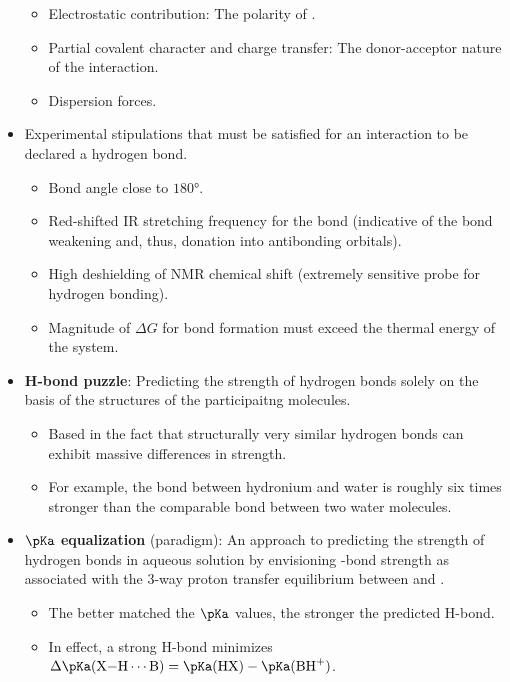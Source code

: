 \documentclass[../notes.tex]{subfiles}
\begin{document}
\begin{itemize}
    \begin{itemize}
        \item Electrostatic contribution: The polarity of .
        \item Partial covalent character and charge transfer: The donor-acceptor nature of the interaction.
        \item Dispersion forces.
    \end{itemize}
    \item Experimental stipulations that must be satisfied for an interaction to be declared a hydrogen bond.
    \begin{itemize}
        \item Bond angle close to $\ang{180}$.
        \item Red-shifted IR stretching frequency for the  bond (indicative of the bond weakening and, thus, donation into antibonding orbitals).
        \item High deshielding of NMR chemical shift (extremely sensitive probe for hydrogen bonding).
        \item Magnitude of $\Delta G$ for bond formation must exceed the thermal energy of the system.
    \end{itemize}
    \item \textbf{H-bond puzzle}: Predicting the strength of hydrogen bonds solely on the basis of the structures of the participaitng molecules.
    \begin{itemize}
        \item Based in the fact that structurally very similar hydrogen bonds can exhibit massive differences in strength.
        \item For example, the  bond between hydronium and water is roughly six times stronger than the comparable bond between two water molecules.
    \end{itemize}
    \item \textbf{$\pKa$ equalization} (paradigm): An approach to predicting the strength of hydrogen bonds in aqueous solution by envisioning -bond strength as associated with the 3-way proton transfer equilibrium between  and .
    \begin{itemize}
        \item The better matched the $\pKa$ values, the stronger the predicted H-bond.
        \item In effect, a strong H-bond minimizes $\Delta\pKa(\ce{X-H\cdots B})=\pKa(\ce{HX})-\pKa(\ce{BH+})$.
    \end{itemize}

\end{itemize}
\end{document}
